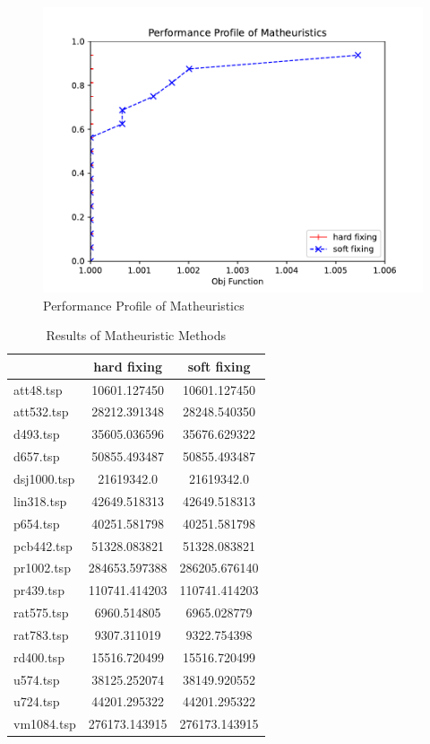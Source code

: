 \begin{figure}[!h]
    \centering
    \includegraphics[width=\textwidth]{images/hs.pdf}
    \caption{Performance Profile of Matheuristics}
    \label{fig:hs}
\end{figure}

\begin{table}[]
    \centering
    \begin{tabular}{lcc}
    \cline{2-3}
                & \textbf{hard fixing} & \textbf{soft fixing} \\ \hline
    att48.tsp   & 10601.127450         & 10601.127450         \\
    att532.tsp  & 28212.391348         & 28248.540350         \\
    d493.tsp    & 35605.036596         & 35676.629322         \\
    d657.tsp    & 50855.493487         & 50855.493487         \\
    dsj1000.tsp & 21619342.0      & 21619342.0      \\
    lin318.tsp  & 42649.518313         & 42649.518313         \\
    p654.tsp    & 40251.581798         & 40251.581798         \\
    pcb442.tsp  & 51328.083821         & 51328.083821         \\
    pr1002.tsp  & 284653.597388        & 286205.676140        \\
    pr439.tsp   & 110741.414203        & 110741.414203        \\
    rat575.tsp  & 6960.514805          & 6965.028779          \\
    rat783.tsp  & 9307.311019          & 9322.754398          \\
    rd400.tsp   & 15516.720499         & 15516.720499         \\
    u574.tsp    & 38125.252074         & 38149.920552         \\
    u724.tsp    & 44201.295322         & 44201.295322         \\
    vm1084.tsp  & 276173.143915        & 276173.143915        \\ \hline
    \end{tabular}
    \caption{Results of Matheuristic Methods}
    \label{table:math}
    \end{table}